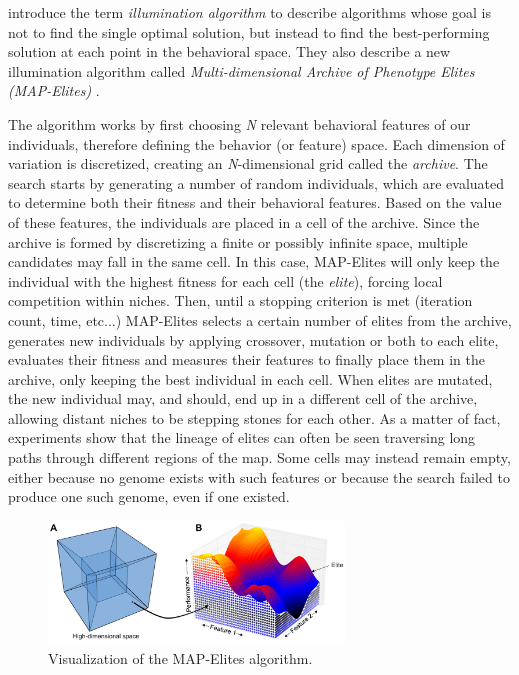  introduce the term \textit{illumination algorithm} to describe algorithms whose goal is not to find the single optimal solution, but instead to find the best-performing solution at each point in the behavioral space. They also describe a new illumination algorithm called \textit{Multi-dimensional Archive of Phenotype Elites (MAP-Elites)} \cite{mouret_illuminating_2015}. 

The algorithm works by first choosing \textit{N} relevant behavioral features of our individuals, therefore defining the behavior (or feature) space. Each dimension of variation is discretized, creating an \textit{N}-dimensional grid called the \textit{archive}. The search starts by generating a number of random individuals, which are evaluated to determine both their fitness and their behavioral features. Based on the value of these features, the individuals are placed in a cell of the archive. Since the archive is formed by discretizing a finite or possibly infinite space, multiple candidates may fall in the same cell. In this case, MAP-Elites will only keep the individual with the highest fitness for each cell (the \textit{elite}), forcing local competition within niches. Then, until a stopping criterion is met (iteration count, time, etc...) MAP-Elites selects a certain number of elites from the archive, generates new individuals by applying crossover, mutation or both to each elite, evaluates their fitness and measures their features to finally place them in the archive, only keeping the best individual in each cell. When elites are mutated, the new individual may, and should, end up in a different cell of the archive, allowing distant niches to be stepping stones for each other. As a matter of fact, experiments show that the lineage of elites can often be seen traversing long paths through different regions of the map. Some cells may instead remain empty, either because no genome exists with such features or because the search failed to produce one such genome, even if one existed. \cite{mouret_illuminating_2015}

\begin{figure}[hbt!]
    \centering
    \includegraphics[width=0.7\textwidth]{Images/MAPElites.png}
    \caption{Visualization of the MAP-Elites algorithm.}
    \label{fig:mapelites}
\end{figure}

